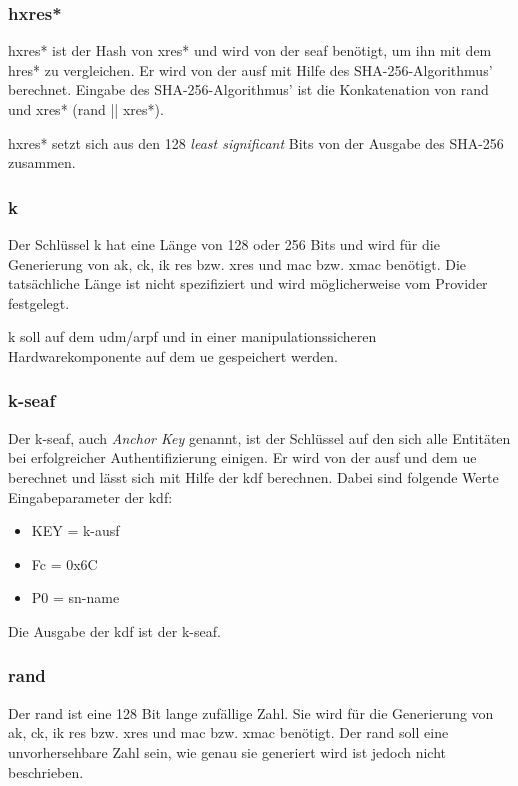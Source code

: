 \subsubsection{\gls{hxres*}}
\gls{hxres*} ist der Hash von \gls{xres*} und wird von der \gls{seaf} benötigt, um ihn mit dem \gls{hres*} zu vergleichen.
Er wird von der \gls{ausf} mit Hilfe des SHA-256-Algorithmus' berechnet. %
Eingabe des SHA-256-Algorithmus' ist die Konkatenation von \gls{rand} und \gls{xres*} (\gls{rand} || \gls{xres*}).

\gls{hxres*} setzt sich aus den 128 \textit{least significant} Bits von der Ausgabe des SHA-256 zusammen.

\subsubsection{\gls{k}}
Der Schlüssel \gls{k} hat eine Länge von 128 oder 256 Bits und wird für die Generierung von \gls{ak}, \gls{ck}, \gls{ik} \gls{res} bzw. \gls{xres} und \gls{mac} bzw. \gls{xmac} benötigt. %
Die tatsächliche Länge ist nicht spezifiziert und wird möglicherweise vom Provider festgelegt. %

\gls{k} soll auf dem \gls{udm}/\gls{arpf} und in einer manipulationssicheren Hardwarekomponente auf dem \gls{ue} gespeichert werden.  %

\subsubsection{\gls{k-seaf}}
Der \gls{k-seaf}, auch \textit{Anchor Key} genannt, ist der Schlüssel auf den sich alle Entitäten bei erfolgreicher Authentifizierung einigen. %
Er wird von der \gls{ausf} und dem \gls{ue} berechnet und lässt sich mit Hilfe der \gls{kdf} berechnen.
Dabei sind folgende Werte Eingabeparameter der \gls{kdf}: %
\begin{itemize}
\item KEY = \gls{k-ausf}
\item Fc = 0x6C
\item P0 = \gls{sn-name}
\end{itemize}
Die Ausgabe der \gls{kdf} ist der \gls{k-seaf}.

\subsubsection{\gls{rand}}
Der \gls{rand} ist eine 128 Bit lange zufällige Zahl. %
Sie wird für die Generierung von \gls{ak}, \gls{ck}, \gls{ik} \gls{res} bzw. \gls{xres} und \gls{mac} bzw. \gls{xmac} benötigt. 
Der \gls{rand} soll eine unvorhersehbare Zahl sein, wie genau sie generiert wird ist jedoch nicht beschrieben. %

